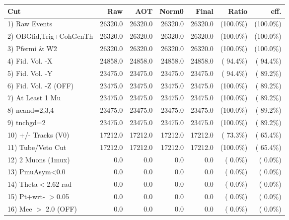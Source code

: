  \begin{table}[h!]\centering
 \begin{tabular}{||l||r|r|r|r|r|r||}
 \hline
 \hline
 Cut & Raw & AOT & Norm0 & Final & Ratio & eff.       \\
 \hline
  1) Raw Events           &      26320.0 &      26320.0 &      26320.0 &      26320.0 & (100.0\%) & (100.0\%) \\
  2) OBGfid,Trig+CohGenTh &      26320.0 &      26320.0 &      26320.0 &      26320.0 & (100.0\%) & (100.0\%) \\
  3) Pfermi \& W2         &      26320.0 &      26320.0 &      26320.0 &      26320.0 & (100.0\%) & (100.0\%) \\
  4) Fid. Vol. -X         &      24858.0 &      24858.0 &      24858.0 &      24858.0 & ( 94.4\%) & ( 94.4\%) \\
  5) Fid. Vol. -Y         &      23475.0 &      23475.0 &      23475.0 &      23475.0 & ( 94.4\%) & ( 89.2\%) \\
  6) Fid. Vol. -Z (OFF)   &      23475.0 &      23475.0 &      23475.0 &      23475.0 & (100.0\%) & ( 89.2\%) \\
  7) At Least 1 Mu        &      23475.0 &      23475.0 &      23475.0 &      23475.0 & (100.0\%) & ( 89.2\%) \\
  8) ncand=2,3,4          &      23475.0 &      23475.0 &      23475.0 &      23475.0 & (100.0\%) & ( 89.2\%) \\
  9) tnchgd=2             &      23475.0 &      23475.0 &      23475.0 &      23475.0 & (100.0\%) & ( 89.2\%) \\
 10) +/- Tracks (V0)      &      17212.0 &      17212.0 &      17212.0 &      17212.0 & ( 73.3\%) & ( 65.4\%) \\
 11) Tube/Veto Cut        &      17212.0 &      17212.0 &      17212.0 &      17212.0 & (100.0\%) & ( 65.4\%) \\
 12) 2 Muons (1mux)       &          0.0 &          0.0 &          0.0 &          0.0 & (  0.0\%) & (  0.0\%) \\
 13) PmuAsym<0.0          &          0.0 &          0.0 &          0.0 &          0.0 & (  0.0\%) & (  0.0\%) \\
 14) Theta$<$2.62 rad     &          0.0 &          0.0 &          0.0 &          0.0 & (  0.0\%) & (  0.0\%) \\
 15) Pt+wrt- $>$0.05      &          0.0 &          0.0 &          0.0 &          0.0 & (  0.0\%) & (  0.0\%) \\
 16) Mee $>$ 2.0  (OFF)   &          0.0 &          0.0 &          0.0 &          0.0 & (  0.0\%) & (  0.0\%) \\

\end{tabular}
\end{table}
